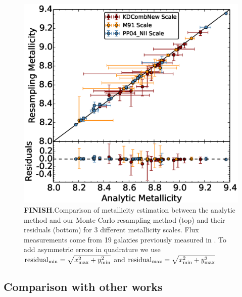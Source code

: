 \documentclass{emulateapj}
\begin{document}
\begin{figure}[ht!]
  \includegraphics[width=1.2\columnwidth]{abcomparison6.eps}
   \caption{\textbf{FINISH}.Comparison of metallicity estimation between the analytic method and our Monte Carlo resampling method (top) and their residuals (bottom) for 3 different metallicity scales. Flux measurements come from 19 galaxies previously measured in \citet{modjaz11}. To add asymmetric errors in quadrature we use $\mathrm{residual}_{\rm min}=\sqrt {x_{\rm max}^2 + y_{\rm min}^2}$ and $\mathrm{residual}_{\rm max}=\sqrt {x_{\rm min}^2 + y_{\rm max}^2}$}
 \label{comp_anal_MC}
\end{figure}





\subsection{Comparison with other works}

\end{document}
